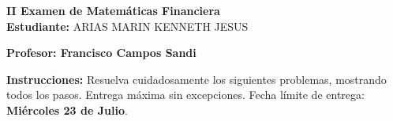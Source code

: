 \documentclass[10pt]{article}
\begin{document}
\newpage
\begin{center}
    {\LARGE \textbf{II Examen de Matemáticas Financiera}}\\[1em]
    {\large \textbf{Estudiante:} ARIAS MARIN KENNETH JESUS}
\end{center}

\vspace{1cm}

\textbf{Profesor: Francisco Campos Sandi}

\vspace{0.5cm}

\textbf{Instrucciones:} Resuelva cuidadosamente los siguientes problemas, mostrando todos los pasos. Entrega máxima sin excepciones. Fecha límite de entrega: \textbf{Miércoles 23 de Julio}.

\vspace{1cm}
\end{document}
